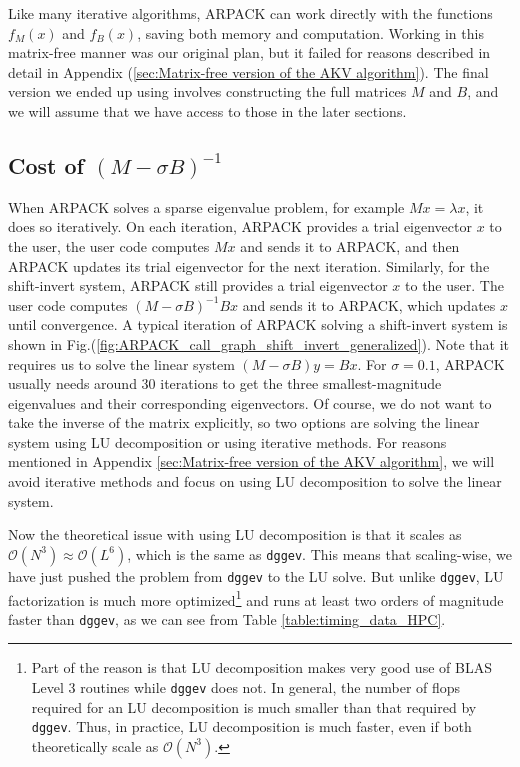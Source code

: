 \documentclass{iopjournal}
\begin{document}
Like many iterative algorithms, ARPACK can work directly with the functions $f_M(x)$ and $f_B(x)$, saving both memory and computation. Working in this matrix-free manner was our original plan, but it failed for reasons described in detail in Appendix (\ref{sec:Matrix-free version of the AKV algorithm}). The final version we ended up using involves constructing the full matrices $M$ and $B$, and we will assume that we have access to those in the later sections.

\subsection{\label{ssec:action-of-shift-invert} Cost of \texorpdfstring{$(M-\sigma B)^{-1}$}{(M-sigma B)^(-1)}}

When ARPACK solves a sparse eigenvalue problem, for example $Mx=\lambda x$, it does so iteratively. On each iteration, ARPACK provides a trial eigenvector $x$ to the user, the user code computes $Mx$ and sends it to ARPACK, and then ARPACK updates its trial eigenvector for the next iteration. Similarly, for the shift-invert system, ARPACK still provides a trial eigenvector $x$ to the user. The user code computes $(M-\sigma B)^{-1}Bx$ and sends it to ARPACK, which updates $x$ until convergence.
A typical iteration of ARPACK solving a shift-invert system is shown in Fig.(\ref{fig:ARPACK_call_graph_shift_invert_generalized}). Note that it requires us to solve the linear system $(M-\sigma B) y=Bx$. For $\sigma=0.1$, ARPACK usually needs around 30 iterations to get the three smallest-magnitude eigenvalues and their corresponding eigenvectors. Of course, we do not want to take the inverse of the matrix explicitly, so two options are solving the linear system using LU decomposition or using iterative methods. For reasons mentioned in Appendix \ref{sec:Matrix-free version of the AKV algorithm}, we will avoid iterative methods and focus on using LU decomposition to solve the linear system.

Now the theoretical issue with using LU decomposition is that it scales as $\mathcal{O}(N^3) \approx \mathcal{O}(L^6)$, which is the same as \texttt{dggev}. This means that scaling-wise, we have just pushed the problem from \texttt{dggev} to the LU solve. But unlike \texttt{dggev}, LU factorization is much more optimized\footnote{Part of the reason is that LU decomposition makes very good use of BLAS Level 3 routines while \texttt{dggev} does not. In general, the number of flops required for an LU decomposition is much smaller than that required by \texttt{dggev}. Thus, in practice, LU decomposition is much faster, even if both theoretically scale as $\mathcal{O}(N^3)$.} and runs at least two orders of magnitude faster than \texttt{dggev}, as we can see from Table \ref{table:timing_data_HPC}.
\end{document}
